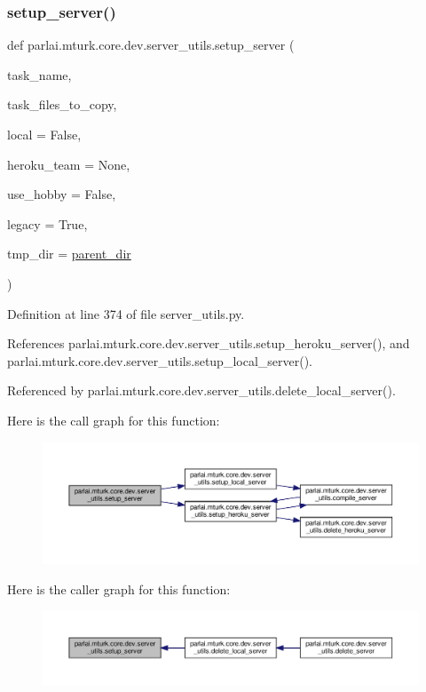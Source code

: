 \subsubsection{\texorpdfstring{setup\+\_\+server()}{setup\_server()}}
{\footnotesize\ttfamily def parlai.\+mturk.\+core.\+dev.\+server\+\_\+utils.\+setup\+\_\+server (\begin{DoxyParamCaption}\item[{}]{task\+\_\+name,  }\item[{}]{task\+\_\+files\+\_\+to\+\_\+copy,  }\item[{}]{local = {\ttfamily False},  }\item[{}]{heroku\+\_\+team = {\ttfamily None},  }\item[{}]{use\+\_\+hobby = {\ttfamily False},  }\item[{}]{legacy = {\ttfamily True},  }\item[{}]{tmp\+\_\+dir = {\ttfamily \hyperlink{namespaceparlai_1_1mturk_1_1core_1_1dev_1_1server__utils_a432ae14c0d872fbfebe4d9b7d73d13b9}{parent\+\_\+dir}} }\end{DoxyParamCaption})}



Definition at line 374 of file server\+\_\+utils.\+py.



References parlai.\+mturk.\+core.\+dev.\+server\+\_\+utils.\+setup\+\_\+heroku\+\_\+server(), and parlai.\+mturk.\+core.\+dev.\+server\+\_\+utils.\+setup\+\_\+local\+\_\+server().



Referenced by parlai.\+mturk.\+core.\+dev.\+server\+\_\+utils.\+delete\+\_\+local\+\_\+server().

Here is the call graph for this function\+:
\nopagebreak
\begin{figure}[H]
\begin{center}
\leavevmode
\includegraphics[width=350pt]{namespaceparlai_1_1mturk_1_1core_1_1dev_1_1server__utils_a13d7101c43eceb479444919d4e5f49fe_cgraph}
\end{center}
\end{figure}
Here is the caller graph for this function\+:
\nopagebreak
\begin{figure}[H]
\begin{center}
\leavevmode
\includegraphics[width=350pt]{namespaceparlai_1_1mturk_1_1core_1_1dev_1_1server__utils_a13d7101c43eceb479444919d4e5f49fe_icgraph}
\end{center}
\end{figure}


